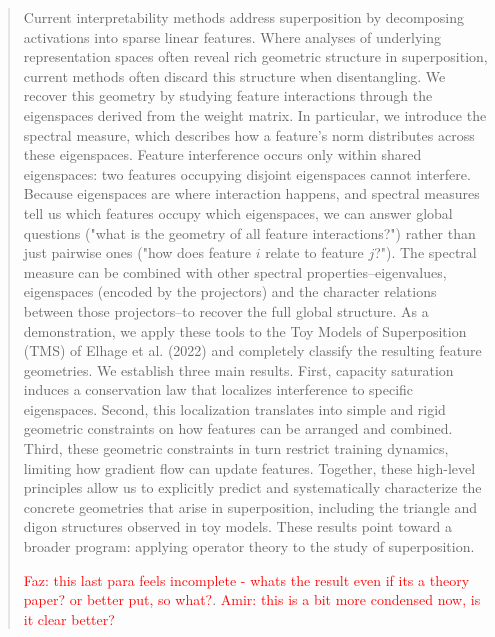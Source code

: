 \documentclass{article}
\theoremstyle{plain}
\numberwithin{equation}{section}
\theoremstyle{definition}
\theoremstyle{remark}
\begin{document}
\begin{abstract}


Current interpretability methods address superposition by decomposing activations into sparse linear features. Where analyses of underlying representation spaces often reveal rich geometric structure in superposition, current methods often discard this structure when disentangling. We recover this geometry by studying feature interactions through the eigenspaces derived from the weight matrix. In particular, we introduce the spectral measure, which describes how a feature's norm distributes across these eigenspaces. Feature interference occurs only within shared eigenspaces: two features occupying disjoint eigenspaces cannot interfere. Because eigenspaces are where interaction happens, and spectral measures tell us which features occupy which eigenspaces, we can answer global questions ("what is the geometry of all feature interactions?") rather than just pairwise ones ("how does feature $i$ relate to feature $j$?"). The spectral measure can be combined with other spectral properties--eigenvalues, eigenspaces (encoded by the projectors) and the character relations between those projectors--to recover the full global structure. As a demonstration, we apply these tools to the Toy Models of Superposition (TMS) of Elhage et al. (2022) and completely classify the resulting feature geometries. We establish three main results. First, capacity saturation induces a conservation law that localizes interference to specific eigenspaces. Second, this localization translates into simple and rigid geometric constraints on how features can be arranged and combined. Third, these geometric constraints in turn restrict training dynamics, limiting how gradient flow can update features. Together, these high-level principles allow us to explicitly predict and systematically characterize the concrete geometries that arise in superposition, including the triangle and digon structures observed in toy models. These results point toward a broader program: applying operator theory to the study of superposition.


\textcolor{red}{Faz: this last para feels incomplete - whats the result even if its a theory paper? or better put, so what?}.
\textcolor{red}{Amir: this is a bit more condensed now, is it clear
better?}


\end{abstract}
\end{document}
